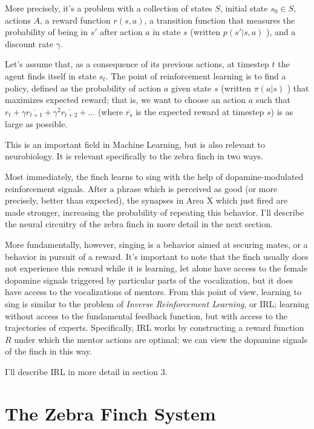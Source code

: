 \documentclass[aps,prl,preprint,groupedaddress]{revtex4-1}
\begin{document}
More precisely, it's a problem with a collection of states $S$, initial state $s_0 \in S$, 
actions $A$, a reward function $r(s, a)$, a transition function that measures the probability of being in $s'$ 
after action $a$ in state $s$ (written $p(s' | s, a)$ ), and a discount rate $\gamma$. 

Let's assume that, as a consequence of its previous actions, at timestep $t$ 
the agent finds itself in state $s_t$. 
The point of reinforcement learning is to find a policy, 
defined as the probability of action $a$ given state $s$ 
(written $\pi (a | s)$ )
that maximizes expected reward; 
that is, we want to choose an action $a$ such that 
$r_t + \gamma \overline{r_{t+1}} + \gamma^2 \overline{r_{t+2}} + \ldots$ 
(where $\overline{r_s}$ is the expected reward at timestep $s$) is as large as possible.

This is an important field in Machine Learning, but is also relevant to neurobiology. 
It is relevant specifically to the zebra finch in two ways. 

Most immediately, the finch learns to sing with the help of dopamine-modulated reinforcement signals. 
After a phrase which is perceived as good (or more precisely, better than expected), 
the synapses in Area X which just fired are made stronger, increasing the probability of repeating this behavior. 
I'll describe the neural circuitry of the zebra finch in more detail in the next section.

More fundamentally, however, singing is a behavior aimed at securing mates, or a behavior in pursuit of a reward. 
It's important to note that the finch usually does not experience this reward while it is learning, 
let alone have access to the female dopamine signals triggered by particular parts of the vocalization,
but it does have access to the vocalizations of mentors. 
From this point of view, learning to sing is similar to the problem of \emph{Inverse Reinforcement Learning}, or IRL; 
learning without access to the fundamental feedback function, but with access to the trajectories of experts. 
Specifically, IRL works by constructing a reward function $R$ under which the mentor actions are optimal; 
we can view the dopamine signals of the finch in this way.

I'll describe IRL in more detail in section $3$.

\section{The Zebra Finch System}
\end{document}

